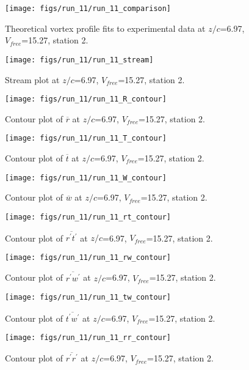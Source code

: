 \begin{figure}[H]
\centering
\texttt{[image: figs/run\_11/run\_11\_comparison]}
\caption{Theoretical vortex profile fits to experimental data at $z/c$=6.97, $V_{free}$=15.27, station 2.}
\end{figure}


\begin{figure}[H]
\centering
\texttt{[image: figs/run\_11/run\_11\_stream]}
\caption{Stream plot at $z/c$=6.97, $V_{free}$=15.27, station 2.}
\end{figure}


\begin{figure}[H]
\centering
\texttt{[image: figs/run\_11/run\_11\_R\_contour]}
\caption{Contour plot of $\overline{r}$ at $z/c$=6.97, $V_{free}$=15.27, station 2.}
\end{figure}


\begin{figure}[H]
\centering
\texttt{[image: figs/run\_11/run\_11\_T\_contour]}
\caption{Contour plot of $\overline{t}$ at $z/c$=6.97, $V_{free}$=15.27, station 2.}
\end{figure}


\begin{figure}[H]
\centering
\texttt{[image: figs/run\_11/run\_11\_W\_contour]}
\caption{Contour plot of $\overline{w}$ at $z/c$=6.97, $V_{free}$=15.27, station 2.}
\end{figure}


\begin{figure}[H]
\centering
\texttt{[image: figs/run\_11/run\_11\_rt\_contour]}
\caption{Contour plot of $\overline{r^\prime t^\prime}$ at $z/c$=6.97, $V_{free}$=15.27, station 2.}
\end{figure}


\begin{figure}[H]
\centering
\texttt{[image: figs/run\_11/run\_11\_rw\_contour]}
\caption{Contour plot of $\overline{r^\prime w^\prime}$ at $z/c$=6.97, $V_{free}$=15.27, station 2.}
\end{figure}


\begin{figure}[H]
\centering
\texttt{[image: figs/run\_11/run\_11\_tw\_contour]}
\caption{Contour plot of $\overline{t^\prime w^\prime}$ at $z/c$=6.97, $V_{free}$=15.27, station 2.}
\end{figure}


\begin{figure}[H]
\centering
\texttt{[image: figs/run\_11/run\_11\_rr\_contour]}
\caption{Contour plot of $\overline{r^\prime r^\prime}$ at $z/c$=6.97, $V_{free}$=15.27, station 2.}
\end{figure}


